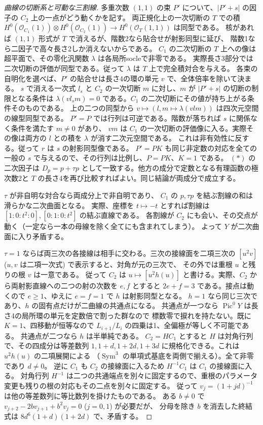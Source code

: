 \begin{proof}[曲線の切断系と可動な三割線]
多重次数 $(1,1)$ の束 $P'$ について、$|P'+s|$ の因子の $C_2$ 上の一点がどう動くかを記す。
両正規化上の一次切断の $T$ での積
$H^0(\mathcal O_{C_1}(1))\otimes H^0(\mathcal O_{C_2}(1))\to H^0(\mathcal O_T(1,1))$ は同型である。
核があれば $(1,1)$ 形式が $T$ で消えるが、階数2なら貼合せが射影同型に延び、
階数1なら二因子で高々長さ2しか消えないからである。
$C_1$ の二次切断の $T$ 上への像は超平面で、その零化汎関数 $\lambda$ は各局所socleで非零である。
実際長さ3部分では二次切断の評価が同型である。従って $\lambda$ は $T$ 上で完全積対合を与える。
各束の自明化を選べば、$P'$ の貼合せは長さ4の環の単元 $v$ で、全体倍率を除いて決まる。
$s$ で消える一次式 $l_s$ と $C_2$ の一次切断 $m$ に対し、$m$ が $|P'+s|$ の切断の制限となる条件は
$\lambda(v l_s m)=0$ である。$C_1$ の二次切断にその値が持ち上がる条件そのものである。
上の二つの同型から $v\mapsto (l,m\mapsto\lambda(vlm))$ は四次元空間の線型同型である。
$P'=P$ では行列は可逆である。階数が落ちれば $s$ に関係なく条件を満たす $m\ne0$ があり、
$vm$ は $C_1$ の一次切断の評価像に入る。実際その像は両方の $l$ との積を $\lambda$ が消す二次元空間である。
これは非有効性に反する。従って $r$ は $s$ の射影同型像である。
$P'=PK$ も同じ非定数の対応を全ての一般の $s$ で与えるので、その行列は比例し、$P=PK$、$K=1$ である。
$(*)$ の二次因子は $D_p=p+\tau p$ として一致する。他方の成分で定数となる有理函数の極次数2と
$T$ の長さ4を再び比較すればよい。同じ結論が両成分で成立する。

$\tau$ が非自明な対合なら両成分上で非自明であり、
$C_1$ の $p,\tau p$ を結ぶ割線の和は滑らかな二次曲面となる。
実際、座標を $t\mapsto-t$ とすれば割線は $[1:0:t^2:0],[0:1:0:t^2]$ の結ぶ直線である。
各割線が $C_2$ にも会い、その交点が動く（一定なら一本の母線を除く全てにも含まれてしまう）。
よって $Y$ が二次曲面に入り矛盾する。

$\tau=1$ ならば両三次の各接線は相手に交わる。三次の接線面を二項三次の
$[u^2v]$ ($u,v$ は二項一次式) で表示すると、対角が元の三次で、
その外では重根 $u$ と残りの根 $v$ は一意である。
従って $C_2$ は $u\mapsto[u^2 h(u)]$ と書ける。実際、$C_2$ から両射影直線への二つの射の次数を
$e,f$ とすると $2e+f=3$ である。接点は動くので $e\ge1$、ゆえに $e=f=1$ で $h$ は射影同型となる。
$h=1$ なら同じ三次であり、$h$ の固有点だけが二曲線の共通点になる。
共通点が一つなら $\operatorname{Pic}^0Y$ は長さ4の局所環の単元を定数倍で割った群なので
標数零で捩れを持たない。既に $K=1$、四移動が恒等なので $L_{i+1}/L_i$ の四乗は1、全偏極が等しく不可能である。
共通点が二つなら $h$ は半単純である。
$C_2=H C_1$ とすると $H$ は対角行列で、その四成分は等差数列
$1,1+d,1+2d,1+3d$ に規格化できる。これは $u^2h(u)$ の二項展開による
（$\operatorname{Sym}^3$ の単項式基底を両側で揃える）。全て非零であり $d\ne0$。
逆に $C_1$ も $C_2$ の接線面に入るため $H^{-1} C_1$ は $C_1$ の接線面に入る。
対角行列 $H^{-1}$ は二つの共通端点を別々に固定するので、重根のパラメータ変更も残りの根の対応もその二点を別々に固定する。
従って $v_j=(1+jd)^{-1}$ は他の等差数列に等比数列を掛けたものである。
ある $b\ne0$ で $v_{j+2}-2b v_{j+1}+b^2v_j=0$ ($j=0,1$) が必要だが、
分母を除き $b$ を消去した終結式は $8d^6(1+d)(1+2d)$ で、矛盾する。


\end{proof}
